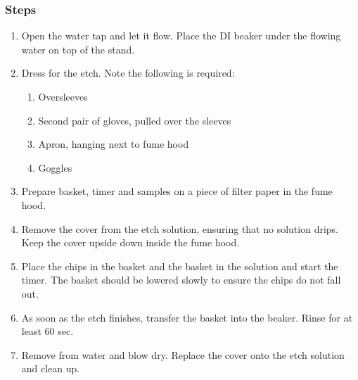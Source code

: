 \subsubsection{Steps}
\begin{enumerate}
\item Open the water tap and let it flow. Place the DI  beaker under the flowing water on top of the stand.
\item Dress for the etch. Note the following is required:
\begin{enumerate}
  \item Oversleeves
  \item Second pair of gloves, pulled over the sleeves
  \item Apron, hanging next to fume hood
  \item Goggles
\end{enumerate}
\item Prepare basket, timer and samples on a piece of filter paper in the fume hood.
\item Remove the cover from the etch solution, ensuring that no solution drips. Keep the cover upside down inside the fume hood.
\item Place the chips in the basket and the basket in the solution and start the timer. The basket should be lowered slowly to ensure the chips do not fall out.
\item As soon as the etch finishes, transfer the basket into the  beaker. Rinse for at least 60 sec.
\item Remove from water and blow dry. Replace the cover onto the etch solution and clean up.
\end{enumerate}
